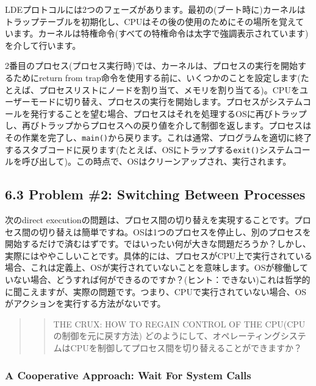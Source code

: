 LDEプロトコルには2つのフェーズがあります。最初の(ブート時に)カーネルはトラップテーブルを初期化し、CPUはその後の使用のためにその場所を覚えています。カーネルは特権命令(すべての特権命令は太字で強調表示されています)を介して行います。

2番目のプロセス(プロセス実行時)では、カーネルは、プロセスの実行を開始するためにreturn
from
trap命令を使用する前に、いくつかのことを設定します(たとえば、プロセスリストにノードを割り当て、メモリを割り当てる)。CPUをユーザーモードに切り替え、プロセスの実行を開始します。プロセスがシステムコールを発行することを望む場合、プロセスはそれを処理するOSに再びトラップし、再びトラップからプロセスへの戻り値を介して制御を返します。プロセスはその作業を完了し、\texttt{main()}から戻ります。これは通常、プログラムを適切に終了するスタブコードに戻ります(たとえば、OSにトラップする\texttt{exit()}システムコールを呼び出して)。この時点で、OSはクリーンアップされ、実行されます。

\hypertarget{problem-2-switching-between-processes}{%
\subsection*{6.3 Problem \#2: Switching Between
Processes}\label{problem-2-switching-between-processes}}

次のdirect
executionの問題は、プロセス間の切り替えを実現することです。プロセス間の切り替えは簡単ですね。OSは1つのプロセスを停止し、別のプロセスを開始するだけで済むはずです。ではいったい何が大きな問題だろうか？しかし、実際にはややこしいことです。具体的には、プロセスがCPU上で実行されている場合、これは定義上、OSが実行されていないことを意味します。OSが稼働していない場合、どうすれば何ができるのですか？(ヒント：できない)これは哲学的に聞こえますが、実際の問題です。つまり、CPUで実行されていない場合、OSがアクションを実行する方法がないです。

\begin{quote}
\begin{quote}
THE CRUX: HOW TO REGAIN CONTROL OF THE CPU(CPUの制御を元に戻す方法)
どのようにして、オペレーティングシステムはCPUを制御してプロセス間を切り替えることができますか？
\end{quote}
\end{quote}

\hypertarget{a-cooperative-approach-wait-for-system-calls}{%
\subsubsection*{A Cooperative Approach: Wait For System
Calls}\label{a-cooperative-approach-wait-for-system-calls}}

